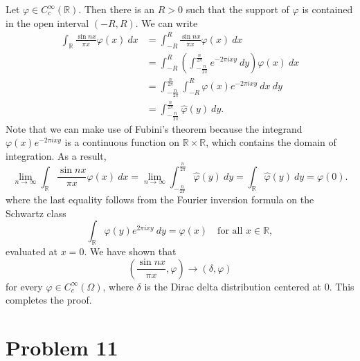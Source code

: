 \documentclass[10pt]{amsart}
\theoremstyle{thmstyle}
\theoremstyle{defstyle}
\newcommand{\R}{\mathbb{R}}
\newcommand{\wh}[1]{\widehat{#1}}
\begin{document}
Let $\varphi\in C_c^\infty(\R)$. Then there is an $R > 0$ such that the support of $\varphi$ is contained in the open interval $(-R, R)$. We can write 
\begin{align*}
	\int_{\R}\frac{\sin nx}{\pi x}\varphi(x)~dx &= \int_{-R}^R\frac{\sin nx}{\pi x}\varphi(x)~dx\\
	&= \int_{-R}^R\left(\int_{-\frac{n}{2\pi}}^{\frac{n}{2\pi}}e^{-2\pi ixy}~dy\right)\varphi(x)~dx\\
	&= \int_{-\frac{n}{2\pi}}^\frac{n}{2\pi}\int_{-R}^R\varphi(x)e^{-2\pi i xy}~dx~dy\\
	&= \int_{-\frac{n}{2\pi}}^{\frac{n}{2\pi}}\wh\varphi(y)~dy.
\end{align*}
Note that we can make use of Fubini's theorem because the integrand $\varphi(x)e^{-2\pi i xy}$ is a continuous function on $\R\times\R$, which contains the domain of integration. As a result,
\begin{equation*}
	\lim_{n\to\infty}\int_{\R}\frac{\sin nx}{\pi x}\varphi(x)~dx = \lim_{n\to\infty}\int_{-\frac{n}{2\pi}}^{\frac{n}{2\pi}}\wh\varphi(y)~dy = \int_{\R}\wh\varphi(y)~dy = \varphi(0).
\end{equation*}
where the last equality follows from the Fourier inversion formula on the Schwartz class 
\begin{equation*}
	\int_{\R}\wh\varphi(y)e^{2\pi i xy}~dy = \varphi(x)\quad\text{for all }x\in\R,
\end{equation*}
evaluated at $x = 0$. We have shown that 
\begin{equation*}
	\left(\frac{\sin nx}{\pi x},\varphi\right)\to(\delta,\varphi)
\end{equation*}
for every $\varphi\in C_c^\infty(\Omega)$, where $\delta$ is the Dirac delta distribution centered at $0$. This completes the proof.

\section{Problem 11}\label{problem-11}
\end{document}

